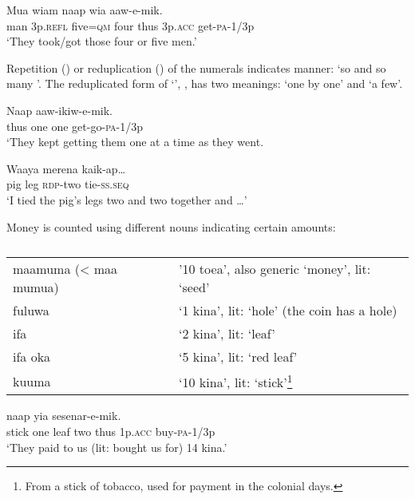 \ea%
\label{ex:x92}
\gll Mua wiam   naap wia aaw-e-mik. \\
man 3p.\textsc{refl} five=\textsc{qm} four thus 3p.\textsc{acc} get-\textsc{pa}-1/3p\\
\glt`They took/got those four or five men.'
\z

Repetition () or reduplication () of the numerals indicates manner: `so and so many '. The reduplicated form of  `', , has two meanings: `one by one' and `a few'. 

\ea%
\label{ex:x93}
\gll Naap   aaw-ikiw-e-mik. \\
thus one one get-go-\textsc{pa}-1/3p\\
\glt`They kept getting them one at a time as they went.
\z

\ea%
\label{ex:x94}
\gll Waaya merena  kaik-ap{\dots} \\
pig leg \textsc{rdp}-two tie-\textsc{ss}.\textsc{seq}\\
\glt`I tied the pig's legs two and two together and {\dots}'
\z

Money is counted using different nouns indicating certain amounts:

\begin{table}
\caption{}
\label{} 
\begin{tabular}{ll}
maamuma ({\textless} maa mumua) &'10 toea', also generic `money', lit: `seed'\\
fuluwa &`1 kina', lit: `hole' (the coin has a hole)\\
ifa &`2 kina', lit: `leaf'\\
ifa oka &`5 kina', lit: `red leaf'\\
kuuma &`10 kina', lit: `stick'\footnote{From a stick of tobacco, used for payment in the colonial days.} \\
\end{tabular}
\end{table}


\ea%
\label{ex:x97}
\gll {}    naap yia sesenar-e-mik. \\
stick one leaf two thus 1p.\textsc{acc} buy-\textsc{pa}-1/3p\\
\glt`They paid to us (lit: bought us for) 14 kina.' 
\z

